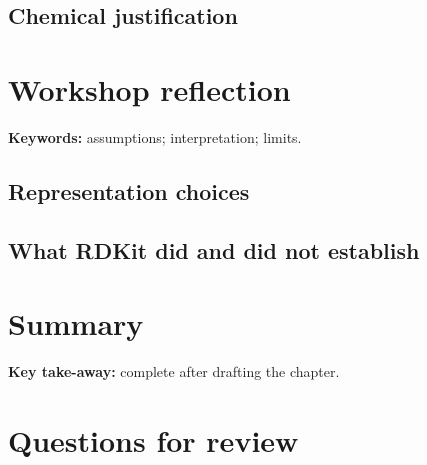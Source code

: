 
\subsection{Chemical justification}


\section{Workshop reflection}

\begin{warningbox}
\textbf{Keywords:} assumptions; interpretation; limits.
\end{warningbox}

\subsection{Representation choices}


\subsection{What RDKit did and did not establish}


\section{Summary}

\begin{notebox}
\textbf{Key take-away:} complete after drafting the chapter.
\end{notebox}

\section{Questions for review}

\solution{4cm}{%
}

